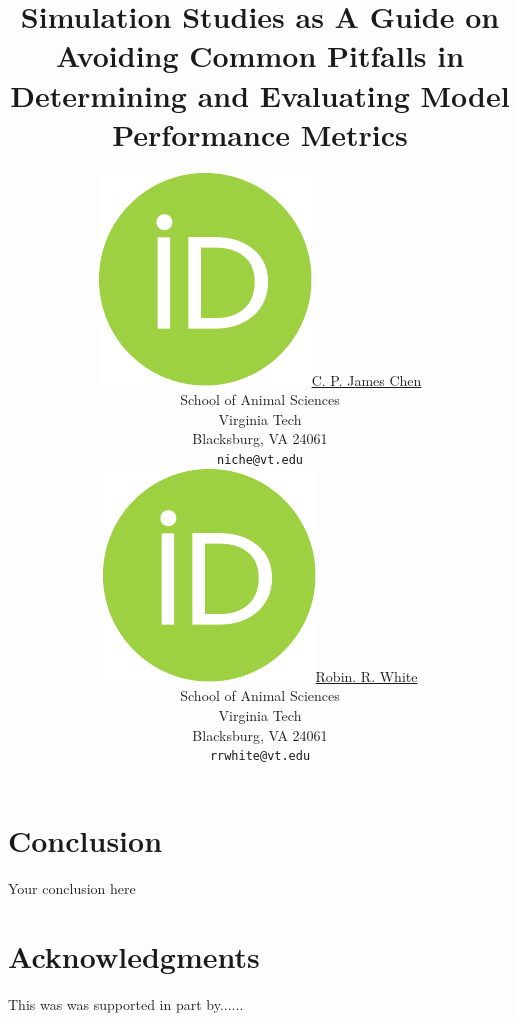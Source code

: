 \documentclass{article}
\title{Simulation Studies as A Guide on Avoiding Common Pitfalls in Determining and Evaluating Model Performance Metrics}
\author{
	\href{https://orcid.org/0000-0002-2018-0702}{\includegraphics[scale=0.06]{orcid.pdf}\hspace{1mm}C. P. James Chen} \\
	School of Animal Sciences\\
	Virginia Tech\\
	Blacksburg, VA 24061 \\
	\texttt{niche@vt.edu} \\
    \And
	\href{https://orcid.org/0000-0001-5713-012X}{\includegraphics[scale=0.06]{orcid.pdf}\hspace{1mm}Robin. R. White} \\
	School of Animal Sciences\\
	Virginia Tech\\
	Blacksburg, VA 24061 \\
	\texttt{rrwhite@vt.edu}
}
\begin{document}
\maketitle


\pagebreak


% 
% 



\section{Conclusion}
Your conclusion here

\section*{Acknowledgments}
This was was supported in part by......




\newpage

\end{document}
